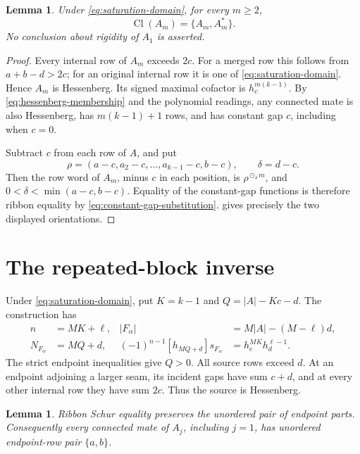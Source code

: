 \documentclass[11pt,a4paper]{amsart}
\numberwithin{equation}{section}
\theoremstyle{plain}
\newtheorem{lemma}[theorem]{Lemma}
\theoremstyle{definition}
\begin{document}
\begin{lemma}\label{lem:merged-block-rigidity}
Under \eqref{eq:saturation-domain}, for every \(m\ge2\),
\[
 \operatorname{Cl}(A_m)=\{A_m,A_m^*\}.
\]
No conclusion about rigidity of \(A_1\) is asserted.
\end{lemma}

\begin{proof}
Every internal row of \(A_m\) exceeds \(2c\).  For a merged row
this follows from \(a+b-d>2c\); for an original internal row it is
one of \eqref{eq:saturation-domain}.  Hence \(A_m\) is Hessenberg.
Its signed maximal cofactor is \(h_c^{m(k-1)}\).
By \eqref{eq:hessenberg-membership} and the polynomial readings, any
connected mate is also Hessenberg, has \(m(k-1)+1\) rows, and has
constant gap \(c\), including when \(c=0\).

Subtract \(c\) from each row of \(A\), and put
\[
 \rho=(a-c,a_2-c,\ldots,a_{k-1}-c,b-c),\qquad \delta=d-c.
\]
Then the row word of \(A_m\), minus \(c\) in each position, is
\(\rho^{\odot_\delta m}\), and
\(0<\delta<\min(a-c,b-c)\).  Equality of the constant-gap functions
is therefore ribbon equality by \eqref{eq:constant-gap-substitution}.
 gives precisely the two displayed
orientations.
\end{proof}

\section{The repeated-block inverse}\label{sec:saturation-proof}

Under \eqref{eq:saturation-domain}, put
\(K=k-1\) and \(Q=|A|-Kc-d\).  The construction has
\begin{equation}\label{eq:saturation-readings}
 \begin{aligned}
 n&=MK+\ell,&
 |F_\alpha|&=M|A|-(M-\ell)d,\\
 N_{F_\alpha}&=MQ+d,&
 (-1)^{n-1}[h_{MQ+d}]s_{F_\alpha}
   &=h_c^{MK}h_d^{\ell-1}.
 \end{aligned}
\end{equation}
The strict endpoint inequalities give \(Q>0\).
All source rows exceed \(d\).  At an endpoint adjoining a larger seam,
its incident gaps have sum \(c+d\), and at every other internal row
they have sum \(2c\).  Thus the source is Hessenberg.

\begin{lemma}\label{lem:ribbon-endpoints}
Ribbon Schur equality preserves the unordered pair of endpoint parts.
Consequently every connected mate of \(A_j\), including \(j=1\),
has unordered endpoint-row pair \(\{a,b\}\).
\end{lemma}
\end{document}
